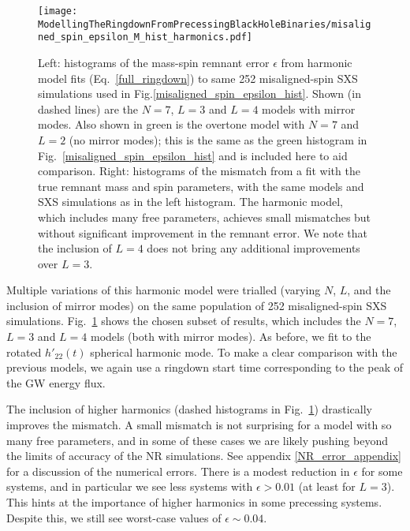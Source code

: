 \begin{figure}[t]
    \centering
    \texttt{[image: ModellingTheRingdownFromPrecessingBlackHoleBinaries/misaligned\_spin\_epsilon\_M\_hist\_harmonics.pdf]}
    \caption[Remnant error and mismatches for fits to misaligned-spin SXS simulations using the harmonic model]{Left: histograms of the mass-spin remnant error $\epsilon$ from harmonic model fits (Eq.~\ref{full_ringdown}) to same 252 misaligned-spin SXS simulations used in Fig.\ref{misaligned_spin_epsilon_hist}. Shown (in dashed lines) are the $N=7$, $L=3$ and $L=4$ models with mirror modes. Also shown in green is the overtone model with $N=7$ and $L=2$ (no mirror modes); this is the same as the green histogram in Fig.~\ref{misaligned_spin_epsilon_hist} and is included here to aid comparison. Right: histograms of the mismatch from a fit with the true remnant mass and spin parameters, with the same models and SXS simulations as in the left histogram. The harmonic model, which includes many free parameters, achieves small mismatches but without significant improvement in the remnant error. We note that the inclusion of $L=4$ does not bring any additional improvements over $L=3$.}
    \label{misaligned_spin_epsilon_hist_harmonics}
\end{figure}

Multiple variations of this harmonic model were trialled (varying $N$, $L$, and the inclusion of mirror modes) on the same population of 252 misaligned-spin SXS simulations.
Fig.~\ref{misaligned_spin_epsilon_hist_harmonics} shows the chosen subset of results, which includes the $N=7$, $L=3$ and $L=4$ models (both with mirror modes). As before, we fit to the rotated $h'_{22}(t)$ spherical harmonic mode.
To make a clear comparison with the previous models, we again use a ringdown start time corresponding to the peak of the GW energy flux.

The inclusion of higher harmonics (dashed histograms in Fig.~\ref{misaligned_spin_epsilon_hist_harmonics}) drastically improves the mismatch.
A small mismatch is not surprising for a model with so many free parameters, and in some of these cases we are likely pushing beyond the limits of accuracy of the NR simulations. See appendix \ref{NR_error_appendix} for a discussion of the numerical errors.
There is a modest reduction in $\epsilon$ for some systems, and in particular we see less systems with $\epsilon > 0.01$ (at least for $L=3$). This hints at the importance of higher harmonics in some precessing systems. Despite this, we still see worst-case values of $\epsilon \sim 0.04$.


